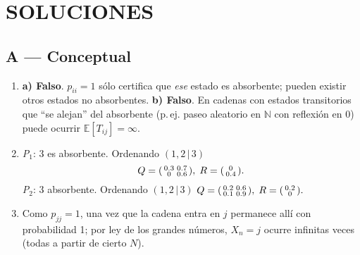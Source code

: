 \documentclass[11pt,spanish]{article}
\newcommand{\E}{\mathbb{E}}
\begin{document}
\newpage
\section*{\large SOLUCIONES}

\subsection*{A — Conceptual}
\begin{enumerate}[label=\textbf{A.\arabic*}]
  \item \textbf{a) Falso}.  \(p_{ii}=1\) sólo certifica que \emph{ese} estado es absorbente; pueden existir otros estados no absorbentes.  
        \textbf{b) Falso}.  En cadenas con estados transitorios que “se alejan” del absorbente (p.\,ej. paseo aleatorio en \(\mathbb{N}\) con reflexión en \(0\)) puede ocurrir \(\E[T_{ij}]=\infty\).

  \item \emph{P\(_1\)}: \(3\) es absorbente.  Ordenando \((1,2\,|\,3)\)
        \[
          Q=\begin{psmallmatrix}0.3&0.7\\0&0.6\end{psmallmatrix},\;
          R=\begin{psmallmatrix}0\\0.4\end{psmallmatrix}.
        \]
        \emph{P\(_2\)}: \(3\) absorbente.  Ordenando \((1,2\,|\,3)\)
        \(Q=\begin{psmallmatrix}0.2&0.6\\0.1&0.9\end{psmallmatrix},\;
          R=\begin{psmallmatrix}0.2\\0\end{psmallmatrix}.\)

  \item Como \(p_{jj}=1\), una vez que la cadena entra en \(j\) permanece allí con probabilidad 1; por ley de los grandes números, \(X_n=j\) ocurre infinitas veces (todas a partir de cierto \(N\)).
\end{enumerate}
\end{document}
